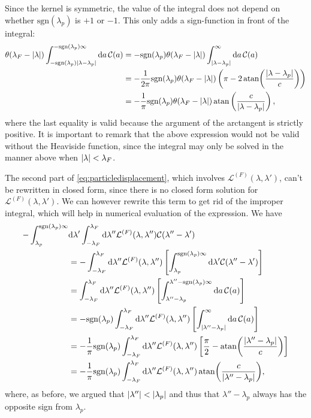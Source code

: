 \documentclass[11pt, a4paper]{report} %
\begin{document}
Since the kernel is symmetric,  the value of the integral does not depend on whether \(\mathrm{sgn}(\lambda_p)\) is \(+1\) or \(-1\).
This only adds a sign-function in front of the integral:
\begin{align}
	\theta(\lambda_F - \abs{\lambda}) \int_{-\textrm{sgn}(\lambda_p)\abs{\lambda-\lambda_p}}^{ - \textrm{sgn}(\lambda_p)\infty} \dd a\,\mathcal{C}(a) &= - \textrm{sgn}(\lambda_p) \theta(\lambda_F - \abs{\lambda}) \int_{\abs{\lambda-\lambda_p}}^{\infty} \dd a\,\mathcal{C}(a)\\
	&= - \frac{1}{2\pi} \textrm{sgn}(\lambda_p) \theta(\lambda_F - \abs{\lambda})  \left( \pi - 2\atan(\frac{\abs{\lambda - \lambda_p}}{c})\right)\label{eq:dpdeltanonsimplified}\\
	&= - \frac{1}{\pi} \textrm{sgn}(\lambda_p) \theta(\lambda_F - \abs{\lambda})  \atan\left(\frac{c}{\abs{\lambda-\lambda_p}}\right),
\end{align}
where the last equality is valid because the argument of the arctangent is strictly positive.
It is important to remark that the above expression would not be valid without the Heaviside function, since the integral may only be solved in the manner above when \(\abs{\lambda}< \lambda_F\).

The second part of \cref{eq:particledisplacement}, which involves \(\mathcal{L}^{(F)}(\lambda,\lambda')\), can't be rewritten in closed form, since there is no closed form solution for \(\mathcal{L}^{(F)}(\lambda,\lambda')\).
We can however rewrite this term to get rid of the improper integral, which will help in numerical evaluation of the expression.
We have
\begin{align}
	- \int_{\lambda_p}^{\textrm{sgn}(\lambda_p)\infty} &\dd \lambda' \int_{-\lambda_F}^{\lambda_F} \dd \lambda''  \mathcal{L}^{(F)}(\lambda,\lambda'') \mathcal{C}(\lambda''-\lambda')\\
	&= -  \int_{-\lambda_F}^{\lambda_F} \dd \lambda''   \mathcal{L}^{(F)}(\lambda,\lambda'') \left[\int_{\lambda_p}^{\textrm{sgn}(\lambda_p)\infty} \dd \lambda'\mathcal{C}(\lambda''-\lambda') \right]\\
	&=   \int_{-\lambda_F}^{\lambda_F} \dd \lambda''   \mathcal{L}^{(F)}(\lambda,\lambda'') \left[\int_{\lambda''-\lambda_p}^{\lambda''-\textrm{sgn}(\lambda_p)\infty} \dd a\,\mathcal{C}(a) \right]\\
	&= -\textrm{sgn}(\lambda_p) \int_{-\lambda_F}^{\lambda_F} \dd \lambda''   \mathcal{L}^{(F)}(\lambda,\lambda'') \left[\int_{\abs{\lambda''-\lambda_p}}^{\infty} \dd a\,\mathcal{C}(a) \right]\\
	&= -\frac{1}{\pi}\textrm{sgn}(\lambda_p) \int_{-\lambda_F}^{\lambda_F} \dd \lambda''   \mathcal{L}^{(F)}(\lambda,\lambda'') \left[\frac{\pi}{2} - \atan(\frac{\abs{\lambda''-\lambda_p}}{c})\right]\\
	&= -\frac{1}{\pi}\textrm{sgn}(\lambda_p) \int_{-\lambda_F}^{\lambda_F} \dd \lambda''   \mathcal{L}^{(F)}(\lambda,\lambda'') \atan(\frac{c}{\abs{\lambda''-\lambda_p}}),
\end{align}
where, as before, we argued that \(\abs{\lambda''} < \abs{\lambda_p}\) and thus that \(\lambda'' - \lambda_p\) always has the opposite sign from \(\lambda_p\).
\end{document}
